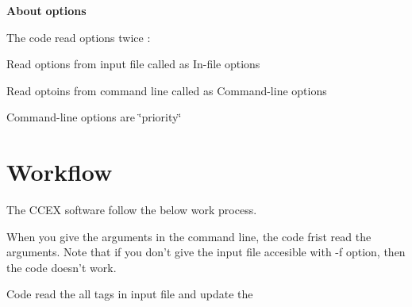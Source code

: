 {\bfseries About} {\bfseries options} 

The code read options twice \-:
\begin{DoxyItemize}
\item Read options from input file called as In-\/file options
\item Read optoins from command line called as Command-\/line options \par
 Command-\/line options are \char`\"{}priority\char`\"{}
\end{DoxyItemize}\hypertarget{GettingStarted_Workflow}{}\section{Workflow}\label{GettingStarted_Workflow}
The C\-C\-E\-X software follow the below work process.

When you give the arguments in the command line, the code frist read the arguments. Note that if you don't give the input file accesible with -\/f option, then the code doesn't work.

Code read the all tags in input file and update the

  